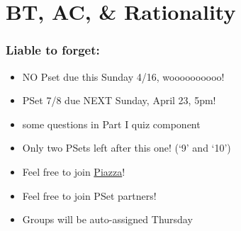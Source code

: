 

\setcounter{section}{7} %



\section{BT, AC, \& Rationality}

\begin{frame}

\scriptsize{\tableofcontents}

\end{frame}

\iffalse 


\begin{frame}
\frametitle{Liable to forget:}

\begin{itemize}[<+->]

\item NO Pset due this Sunday 4/16, woooooooooo!

\item PSet 7/8 due NEXT Sunday, April 23, 5pm!

\item[] some questions in Part I quiz component %

\item Only two PSets left after this one! (`9' and `10')


\item Feel free to join \href{https://piazza.com/mit/spring2023/24118}{Piazza}! 

\item Feel free to join PSet partners!
\item[] Groups will be auto-assigned Thursday 


\end{itemize}
\end{frame}

